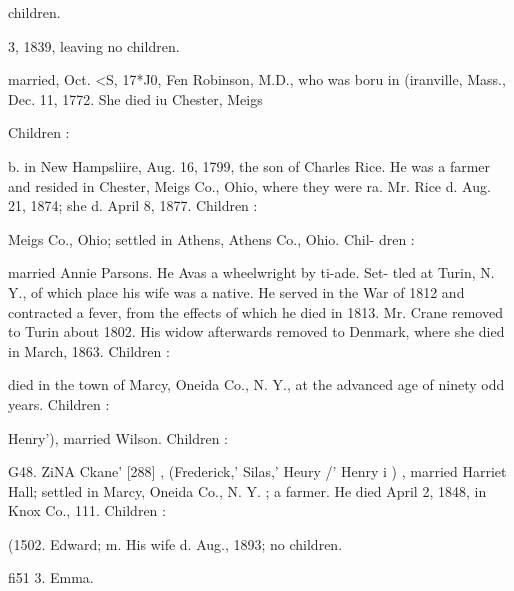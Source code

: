 \documentclass{book}
\begin{document}
children. 



3, 1839, leaving no children. 

married, Oct. <S, 17*J0, Fen Robinson, M.D., who was boru in 
(iranville, Mass., Dec. 11, 1772. She died iu Chester, Meigs 

Children : 












b. in New Hampsliire, Aug. 16, 1799, the son of Charles Rice. 
He was a farmer and resided in Chester, Meigs Co., Ohio, 
where they were ra. Mr. Rice d. Aug. 21, 1874; she d. April 
8, 1877. Children : 










Meigs Co., Ohio; settled in Athens, Athens Co., Ohio. Chil- 
dren : 









married Annie Parsons. He Avas a wheelwright by ti-ade. Set- 
tled at Turin, N. Y., of which place his wife was a native. He 
served in the War of 1812 and contracted a fever, from the 
effects of which he died in 1813. Mr. Crane removed to Turin 
about 1802. His widow afterwards removed to Denmark, where 
she died in March, 1863. Children : 


died in the town of Marcy, Oneida Co., N. Y., at the advanced 
age of ninety odd years. Children : 











Henry'), married Wilson. Children : 






G48. ZiNA Ckane' [288] , (Frederick,' Silas,' Heury /' Henry i ) , 
married Harriet Hall; settled in Marcy, Oneida Co., N. Y. ; a 
farmer. He died April 2, 1848, in Knox Co., 111. Children : 


(1502. Edward; m. His wife d. Aug., 1893; no children. 

fi51  3. Emma. 
\end{document}

